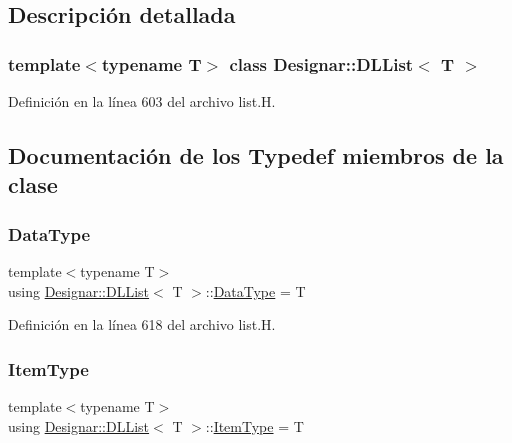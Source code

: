 \subsection{Descripción detallada}
\subsubsection*{template$<$typename T$>$\newline
class Designar\+::\+D\+L\+List$<$ T $>$}



Definición en la línea 603 del archivo list.\+H.



\subsection{Documentación de los \textquotesingle{}Typedef\textquotesingle{} miembros de la clase}
\mbox{\label{class_designar_1_1_d_l_list_ac2f57201101389ca63aec1c2fba61038}} 
\subsubsection{\texorpdfstring{Data\+Type}{DataType}}
{\footnotesize\ttfamily template$<$typename T$>$ \\
using \hyperlink{class_designar_1_1_d_l_list}{Designar\+::\+D\+L\+List}$<$ T $>$\+::\hyperlink{class_designar_1_1_d_l_list_ac2f57201101389ca63aec1c2fba61038}{Data\+Type} =  T}



Definición en la línea 618 del archivo list.\+H.

\mbox{\label{class_designar_1_1_d_l_list_a622fc13673b169c75309314ae2ebc005}} 
\subsubsection{\texorpdfstring{Item\+Type}{ItemType}}
{\footnotesize\ttfamily template$<$typename T$>$ \\
using \hyperlink{class_designar_1_1_d_l_list}{Designar\+::\+D\+L\+List}$<$ T $>$\+::\hyperlink{class_designar_1_1_d_l_list_a622fc13673b169c75309314ae2ebc005}{Item\+Type} =  T}



